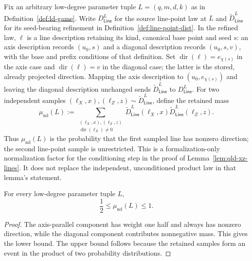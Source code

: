 \begin{definition}
	\label{def:nondegenerate-line-pasting-mass}
	\leanok
	Fix an arbitrary low-degree parameter tuple $L=(q,m,d,k)$ as in
	Definition~\ref{def:ld-game}. Write $D_{\mathsf{Line}}^L$ for the source
	line-point law at $L$ and $\widetilde D_{\mathsf{Line}}^L$ for its
	seed-bearing refinement in Definition~\ref{def:line-point-dist}. In the
	refined law, $\ell$ is a line description retaining its kind, canonical base
	point and seed $s$: an axis description records $(u_0,s)$ and a diagonal
	description records $(u_0,s,v)$, with the base and prefix conditions of that
	definition. Set $\operatorname{dir}(\ell)=e_{\chi(s)}$ in the axis case and
	$\operatorname{dir}(\ell)=v$ in the diagonal case; the latter is the stored,
	already projected direction. Mapping the axis description to
	$(u_0,e_{\chi(s)})$ and leaving the diagonal description unchanged sends
	$\widetilde D_{\mathsf{Line}}^L$ to $D_{\mathsf{Line}}^L$.
	For two independent samples
	$(\ell_X,x),(\ell_Z,z)\sim\widetilde D_{\mathsf{Line}}^L$, define the retained mass
	\[
		\mu_{\mathrm{nd}}(L)
		:= \sum_{\substack{(\ell_X,x),(\ell_Z,z)\\
			\operatorname{dir}(\ell_X)\ne 0}}
		\widetilde D_{\mathsf{Line}}^L(\ell_X,x)
		\widetilde D_{\mathsf{Line}}^L(\ell_Z,z).
	\]
	Thus $\mu_{\mathrm{nd}}(L)$ is the probability that the first sampled line
	has nonzero direction; the second line-point sample is unrestricted. This is
	a formalization-only normalization factor for the conditioning step in the
	proof of Lemma~\ref{lem:qld-xz-lines}. It does not replace the independent,
	unconditioned product law in that lemma's statement.
\end{definition}

\begin{theorem}
	\label{thm:nondegenerate-line-pasting-mass-bounds}
	\leanok
	For every low-degree parameter tuple $L$,
	\[
		\frac12\leq \mu_{\mathrm{nd}}(L)\leq 1.
	\]
\end{theorem}
\begin{proof}
	\leanok
	The axis-parallel component has weight one half and always has nonzero
	direction, while the diagonal component contributes nonnegative mass. This
	gives the lower bound. The upper bound follows because the retained samples
	form an event in the product of two probability distributions.
\end{proof}

